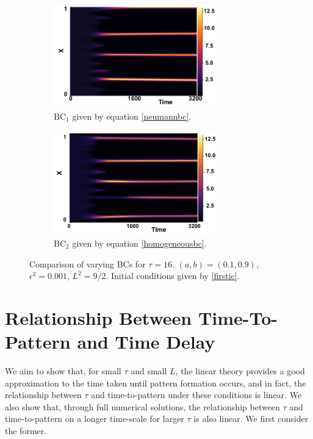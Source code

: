 \begin{figure}[H]
    \centering
    \begin{subfigure}[t]{0.45\textwidth}
        \centering
        \includegraphics[width=7cm,height=4.5cm]{ic216.png}
        \caption{$\text{BC}_1$ given by equation \eqref{neumannbc}.}
        \label{}
    \end{subfigure}
    \hfill
    \begin{subfigure}[t]{0.45\textwidth}
        \centering
        \includegraphics[width=7cm,height=4.5cm]{bc16.png}
        \caption{$\text{BC}_2$ given by equation \eqref{homogeneousbc}.}
        \label{}
    \end{subfigure}
    \caption{Comparison of varying BCs for $\tau=16$. $(a,b)=(0.1,0.9)$, $\epsilon^2=0.001$, $L^2=9/2$. Initial conditions given by \eqref{firstic}.}
    \label{fig:bctau3}
\end{figure}

\section{Relationship Between Time-To-Pattern and Time Delay}\label{section:delaypatt}

We aim to show that, for small $\tau$ and small $L$, the linear theory provides a good approximation to the time taken until pattern formation occurs, and in fact, the relationship between $\tau$ and time-to-pattern under these conditions is linear. We also show that, through full numerical solutions, the relationship between $\tau$ and time-to-pattern on a longer time-scale for larger $\tau$ is also linear. We first consider the former.

